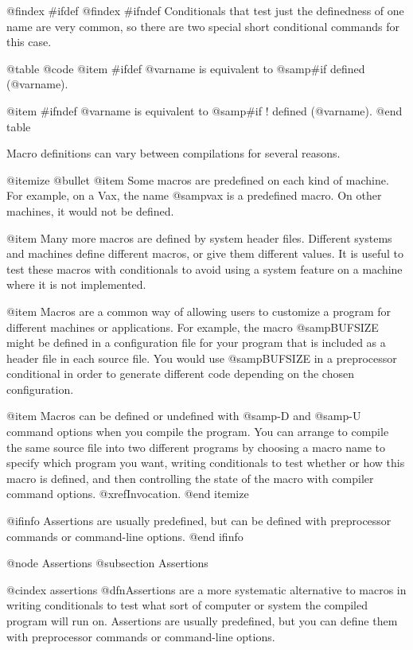 {{@findex #ifdef
@findex #ifndef
Conditionals that test just the definedness of one name are very common, so
there are two special short conditional commands for this case.

@table @code
@item #ifdef @var{name}
is equivalent to @samp{#if defined (@var{name})}.

@item #ifndef @var{name}
is equivalent to @samp{#if ! defined (@var{name})}.
@end table

Macro definitions can vary between compilations for several reasons.

@itemize @bullet
@item
Some macros are predefined on each kind of machine.  For example, on a
Vax, the name @samp{vax} is a predefined macro.  On other machines, it
would not be defined.

@item
Many more macros are defined by system header files.  Different
systems and machines define different macros, or give them different
values.  It is useful to test these macros with conditionals to avoid
using a system feature on a machine where it is not implemented.

@item
Macros are a common way of allowing users to customize a program for
different machines or applications.  For example, the macro
@samp{BUFSIZE} might be defined in a configuration file for your
program that is included as a header file in each source file.  You
would use @samp{BUFSIZE} in a preprocessor conditional in order to
generate different code depending on the chosen configuration.

@item
Macros can be defined or undefined with @samp{-D} and @samp{-U}
command options when you compile the program.  You can arrange to
compile the same source file into two different programs by choosing
a macro name to specify which program you want, writing conditionals
to test whether or how this macro is defined, and then controlling
the state of the macro with compiler command options.
@xref{Invocation}.
@end itemize

@ifinfo
Assertions are usually predefined, but can be defined with preprocessor
commands or command-line options.
@end ifinfo

@node Assertions
@subsection Assertions

@cindex assertions
@dfn{Assertions} are a more systematic alternative to macros in writing
conditionals to test what sort of computer or system the compiled
program will run on.  Assertions are usually predefined, but you can
define them with preprocessor commands or command-line options.

}}
